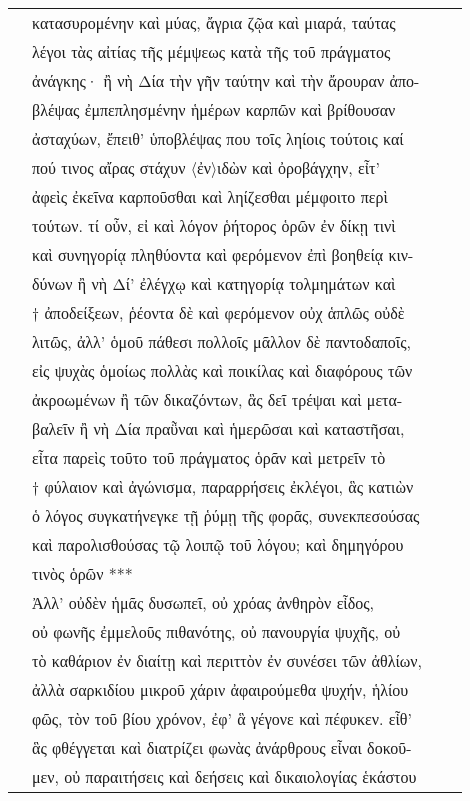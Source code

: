 \documentclass[a4paper,12pt]{article}
\begin{document}
\begin{center}
\begin{xtabular}{p{1cm}p{10.5454545454545cm}p{0.8cm}p{0cm}}
&κατασυρομένην καὶ μύας, ἄγρια ζῷα καὶ μιαρά, ταύτας &&\\
&λέγοι τὰς αἰτίας τῆς μέμψεως κατὰ τῆς τοῦ πράγματος &&\\
&ἀνάγκης· ἢ νὴ Δία τὴν γῆν ταύτην καὶ τὴν ἄρουραν ἀπο-&&\\
&βλέψας ἐμπεπλησμένην ἡμέρων καρπῶν καὶ βρίθουσαν &&\\
&ἀσταχύων, ἔπειθ’ ὑποβλέψας που τοῖς ληίοις τούτοις καί &&\\
&πού τινος αἴρας στάχυν 〈ἐν〉ιδὼν καὶ ὀροβάγχην, εἶτ’ &&\\
&ἀφεὶς ἐκεῖνα καρποῦσθαι καὶ ληίζεσθαι μέμφοιτο περὶ &&\\
&τούτων. τί οὖν, εἰ καὶ λόγον ῥήτορος ὁρῶν ἐν δίκῃ τινὶ &&\\
&καὶ συνηγορίᾳ πληθύοντα καὶ φερόμενον ἐπὶ βοηθείᾳ κιν-&&\\
&δύνων ἢ νὴ Δί’ ἐλέγχῳ καὶ κατηγορίᾳ τολμημάτων καὶ &&\\
&† ἀποδείξεων, ῥέοντα δὲ καὶ φερόμενον οὐχ ἁπλῶς οὐδὲ &&\\
&λιτῶς, ἀλλ’ ὁμοῦ πάθεσι πολλοῖς μᾶλλον δὲ παντοδαποῖς, &&\\
&εἰς ψυχὰς ὁμοίως πολλὰς καὶ ποικίλας καὶ διαφόρους τῶν &&\\
&ἀκροωμένων ἢ τῶν δικαζόντων, ἃς δεῖ τρέψαι καὶ μετα-&&\\
&βαλεῖν ἢ νὴ Δία πραῧναι καὶ ἡμερῶσαι καὶ καταστῆσαι, &&\\
&εἶτα παρεὶς τοῦτο τοῦ πράγματος ὁρᾶν καὶ μετρεῖν τὸ &&\\
&† φύλαιον καὶ ἀγώνισμα, παραρρήσεις ἐκλέγοι, ἃς κατιὼν &&\\
&ὁ λόγος συγκατήνεγκε τῇ ῥύμῃ τῆς φορᾶς, συνεκπεσούσας  &&\\
&καὶ παρολισθούσας τῷ λοιπῷ τοῦ λόγου; καὶ δημηγόρου &&\\
&τινὸς ὁρῶν *** &&\\
&Ἀλλ’ οὐδὲν ἡμᾶς δυσωπεῖ, οὐ χρόας ἀνθηρὸν εἶδος, &&\\
&οὐ φωνῆς ἐμμελοῦς πιθανότης, οὐ πανουργία ψυχῆς, οὐ &&\\
&τὸ καθάριον ἐν διαίτῃ καὶ περιττὸν ἐν συνέσει τῶν ἀθλίων, &&\\
&ἀλλὰ σαρκιδίου μικροῦ χάριν ἀφαιρούμεθα ψυχήν, ἡλίου &&\\
&φῶς, τὸν τοῦ βίου χρόνον, ἐφ’ ἃ γέγονε καὶ πέφυκεν. εἶθ’ &&\\
&ἃς φθέγγεται καὶ διατρίζει φωνὰς ἀνάρθρους εἶναι δοκοῦ-&&\\
&μεν, οὐ παραιτήσεις καὶ δεήσεις καὶ δικαιολογίας ἑκάστου &&\\

\end{xtabular}
\end{center}
\end{document}
